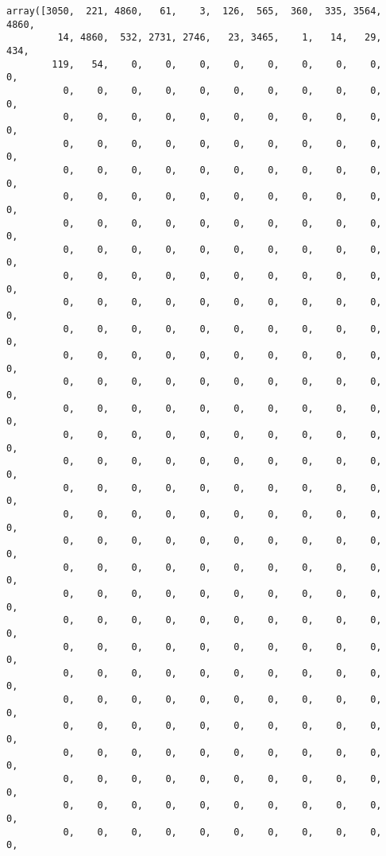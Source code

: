 \documentclass[11pt]{article}
\makeatletter
\newcommand{\boxspacing}{\kern\kvtcb@left@rule\kern\kvtcb@boxsep}
\newcommand{\prompt}[4]{
        \ttfamily\llap{{\color{#2}[#3]:\hspace{3pt}#4}}\vspace{-\baselineskip}
    }
\makeatother
\begin{document}
            \begin{tcolorbox}[breakable, size=fbox, boxrule=.5pt, pad at break*=1mm, opacityfill=0]
\prompt{Out}{outcolor}{21}{\boxspacing}
\begin{Verbatim}[commandchars=\\\{\}]
array([3050,  221, 4860,   61,    3,  126,  565,  360,  335, 3564, 4860,
         14, 4860,  532, 2731, 2746,   23, 3465,    1,   14,   29,  434,
        119,   54,    0,    0,    0,    0,    0,    0,    0,    0,    0,
          0,    0,    0,    0,    0,    0,    0,    0,    0,    0,    0,
          0,    0,    0,    0,    0,    0,    0,    0,    0,    0,    0,
          0,    0,    0,    0,    0,    0,    0,    0,    0,    0,    0,
          0,    0,    0,    0,    0,    0,    0,    0,    0,    0,    0,
          0,    0,    0,    0,    0,    0,    0,    0,    0,    0,    0,
          0,    0,    0,    0,    0,    0,    0,    0,    0,    0,    0,
          0,    0,    0,    0,    0,    0,    0,    0,    0,    0,    0,
          0,    0,    0,    0,    0,    0,    0,    0,    0,    0,    0,
          0,    0,    0,    0,    0,    0,    0,    0,    0,    0,    0,
          0,    0,    0,    0,    0,    0,    0,    0,    0,    0,    0,
          0,    0,    0,    0,    0,    0,    0,    0,    0,    0,    0,
          0,    0,    0,    0,    0,    0,    0,    0,    0,    0,    0,
          0,    0,    0,    0,    0,    0,    0,    0,    0,    0,    0,
          0,    0,    0,    0,    0,    0,    0,    0,    0,    0,    0,
          0,    0,    0,    0,    0,    0,    0,    0,    0,    0,    0,
          0,    0,    0,    0,    0,    0,    0,    0,    0,    0,    0,
          0,    0,    0,    0,    0,    0,    0,    0,    0,    0,    0,
          0,    0,    0,    0,    0,    0,    0,    0,    0,    0,    0,
          0,    0,    0,    0,    0,    0,    0,    0,    0,    0,    0,
          0,    0,    0,    0,    0,    0,    0,    0,    0,    0,    0,
          0,    0,    0,    0,    0,    0,    0,    0,    0,    0,    0,
          0,    0,    0,    0,    0,    0,    0,    0,    0,    0,    0,
          0,    0,    0,    0,    0,    0,    0,    0,    0,    0,    0,
          0,    0,    0,    0,    0,    0,    0,    0,    0,    0,    0,
          0,    0,    0,    0,    0,    0,    0,    0,    0,    0,    0,
          0,    0,    0,    0,    0,    0,    0,    0,    0,    0,    0,
          0,    0,    0,    0,    0,    0,    0,    0,    0,    0,    0,
          0,    0,    0,    0,    0,    0,    0,    0,    0,    0,    0,
          0,    0,    0,    0,    0,    0,    0,    0,    0,    0,    0,

\end{Verbatim}
\end{tcolorbox}
\end{document}
